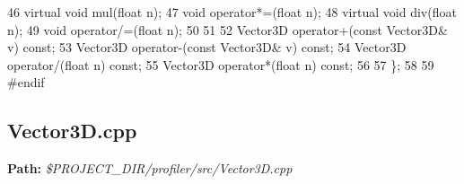 \begin{DoxyCodeInclude}
46     \textcolor{keyword}{virtual} \textcolor{keywordtype}{void} mul(\textcolor{keywordtype}{float} n);
47     \textcolor{keywordtype}{void} operator*=(\textcolor{keywordtype}{float} n);
48     \textcolor{keyword}{virtual} \textcolor{keywordtype}{void} div(\textcolor{keywordtype}{float} n);
49     \textcolor{keywordtype}{void} operator/=(\textcolor{keywordtype}{float} n);
50     
51     
52     Vector3D operator+(\textcolor{keyword}{const} Vector3D& v) \textcolor{keyword}{const};
53     Vector3D operator-(\textcolor{keyword}{const} Vector3D& v) \textcolor{keyword}{const};
54     Vector3D operator/(\textcolor{keywordtype}{float} n) \textcolor{keyword}{const};
55     Vector3D operator*(\textcolor{keywordtype}{float} n) \textcolor{keyword}{const};
56     
57 \};
58 
59 \textcolor{preprocessor}{#endif}
\end{DoxyCodeInclude}
 \hypertarget{_benchmark_program_BenchmarkProgramVector3D_cpp}{}\subsection{Vector3\+D.\+cpp}\label{_benchmark_program_BenchmarkProgramVector3D_cpp}
{\bfseries Path\+:} {\itshape \$\+P\+R\+O\+J\+E\+C\+T\+\_\+\+D\+I\+R/profiler/src/\+Vector3\+D.cpp} 
